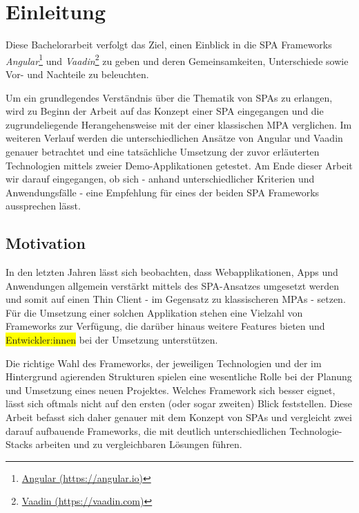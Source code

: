 \documentclass[a4paper,12pt,twoside]{scrreprt}
\begin{document}
\chapter{Einleitung}
\label{chap:einleitung}
Diese Bachelorarbeit verfolgt das Ziel, einen Einblick in die \ac{SPA} Frameworks \textit{Angular}\footnote{\href{https://angular.io/}{Angular (https://angular.io)}} und \textit{Vaadin}\footnote{\href{https://vaadin.com/}{Vaadin (https://vaadin.com)}} zu geben und deren Gemeinsamkeiten, Unterschiede sowie Vor- und Nachteile zu beleuchten.

\medskip

Um ein grundlegendes Verständnis über die Thematik von \aclp{SPA} zu erlangen, wird zu Beginn der Arbeit auf das Konzept einer \ac{SPA} eingegangen und die zugrundeliegende Herangehensweise mit der einer klassischen \ac{MPA} verglichen. Im weiteren Verlauf werden die unterschiedlichen Ansätze von Angular und Vaadin genauer betrachtet und eine tatsächliche Umsetzung der zuvor erläuterten Technologien mittels zweier Demo-Applikationen getestet. Am Ende dieser Arbeit wir darauf eingegangen, ob sich - anhand unterschiedlicher Kriterien und Anwendungsfälle - eine Empfehlung für eines der beiden \acs{SPA} Frameworks aussprechen lässt.

\section{Motivation}
\label{sec:motivation}
In den letzten Jahren lässt sich beobachten, dass Webapplikationen, Apps und Anwendungen allgemein verstärkt mittels des \acs{SPA}-Ansatzes umgesetzt werden und somit auf einen Thin Client - im Gegensatz zu klassischeren \aclp{MPA} - setzen. Für die Umsetzung einer solchen Applikation stehen eine Vielzahl von Frameworks zur Verfügung, die darüber hinaus weitere Features bieten und \colorbox{yellow}{Entwickler:innen} bei der Umsetzung unterstützen.

\newpage

Die richtige Wahl des Frameworks, der jeweiligen Technologien und der im Hintergrund agierenden Strukturen spielen eine wesentliche Rolle bei der Planung und Umsetzung eines neuen Projektes. Welches Framework sich besser eignet, lässt sich oftmals nicht auf den ersten (oder sogar zweiten) Blick feststellen. Diese Arbeit befasst sich daher genauer mit dem Konzept von \aclp{SPA} und vergleicht zwei darauf aufbauende Frameworks, die mit deutlich unterschiedlichen Technologie-Stacks arbeiten und zu vergleichbaren Lösungen führen.
\end{document}

